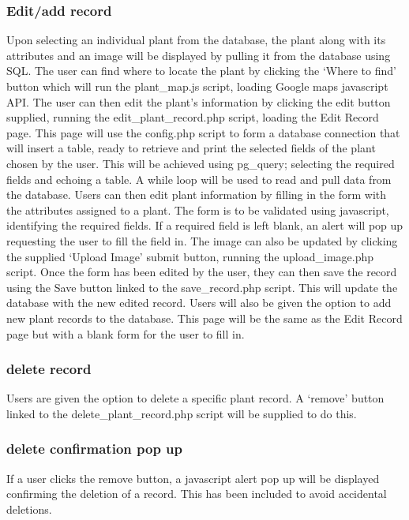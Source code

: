 	\subsubsection{Edit/add record}
		Upon selecting an individual plant from the database, the plant along with its attributes and an image will be displayed by pulling it from the database using SQL. The user can find where to locate the plant by clicking the ‘Where to find’ button which will run the plant\_map.js script, loading Google maps javascript API. The user can then edit the plant’s information by clicking the edit button supplied, running the edit\_plant\_record.php script, loading the Edit Record page. This page will use the config.php script to form a database connection that will insert a table, ready to retrieve and print the selected fields of the plant chosen by the user. This will be achieved using pg\_query; selecting the required fields and echoing a table. A while loop will be used to read and  pull data from the database. Users can then edit plant information by filling in the form with the attributes assigned to a plant. The form is to be validated using javascript, identifying the required fields. If a required field is left blank, an alert will pop up requesting the user to fill the field in. The image can also be updated by clicking the supplied ‘Upload Image’ submit button, running the upload\_image.php script. Once the form has been edited by the user, they can then save the record using the Save button linked to the save\_record.php script. This will update the database with the new edited record. Users will also be given the option to add new plant records to the database. This page will be the same as the Edit Record page but with a blank form for the user to fill in.

	\subsubsection{delete record}
		Users are given the option to delete a specific plant record. A ‘remove’ button linked to the delete\_plant\_record.php script will be supplied to do this.

	\subsubsection{delete confirmation pop up}
		If a user clicks the remove button, a javascript alert pop up will be displayed confirming the deletion of a record. This has been included to avoid accidental deletions.

